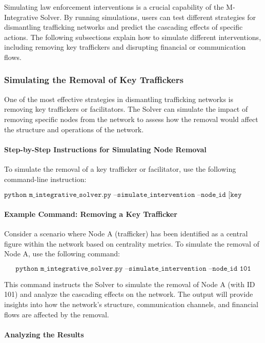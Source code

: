 \documentclass[%
 preprint, linenumbers,
 amsmath,amssymb,
 aps, physrev,
]{revtex4-2}
\begin{document}
Simulating law enforcement interventions is a crucial capability of the M-Integrative Solver. By running simulations, users can test different strategies for dismantling trafficking networks and predict the cascading effects of specific actions. The following subsections explain how to simulate different interventions, including removing key traffickers and disrupting financial or communication flows.

\subsubsection{Simulating the Removal of Key Traffickers}

One of the most effective strategies in dismantling trafficking networks is removing key traffickers or facilitators. The Solver can simulate the impact of removing specific nodes from the network to assess how the removal would affect the structure and operations of the network.

\paragraph{Step-by-Step Instructions for Simulating Node Removal}

To simulate the removal of a key trafficker or facilitator, use the following command-line instruction:

\[
\texttt{python m\_integrative\_solver.py --simulate\_intervention --node\_id [key trafficker ID]}
\]

\paragraph{Example Command: Removing a Key Trafficker}

Consider a scenario where Node A (trafficker) has been identified as a central figure within the network based on centrality metrics. To simulate the removal of Node A, use the following command:

\[
\texttt{python m\_integrative\_solver.py --simulate\_intervention --node\_id 101}
\]

This command instructs the Solver to simulate the removal of Node A (with ID 101) and analyze the cascading effects on the network. The output will provide insights into how the network’s structure, communication channels, and financial flows are affected by the removal.

\paragraph{Analyzing the Results}
\end{document}
